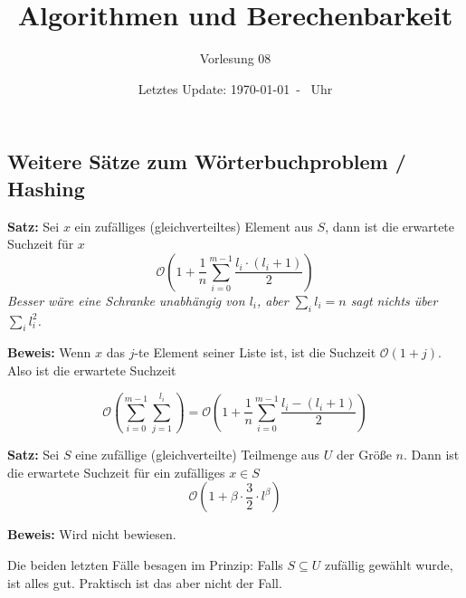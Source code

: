 \documentclass{scrartcl}%
\begin{document}
    \subject{Vorlesungsmitschrift}
    \title{Algorithmen und Berechenbarkeit}
    \subtitle{Vorlesung 08}
    \date{Letztes Update: \today \ - \currenttime \ Uhr}
    \maketitle


    \subsection*{Weitere Sätze zum Wörterbuchproblem / Hashing}\label{subsec:erwarteteSuchzeit}
    \textbf{\textsf{Satz:}} Sei $x$ ein zufälliges (gleichverteiltes) Element aus $S$, dann ist die erwartete Suchzeit für $x$
    \begin{equation*}
        \mathcal{O}\left(1+\dfrac{1}{n} \sum_{i=0}^{m-1}\dfrac{l_i \cdot (l_i + 1)}{2}\right)
    \end{equation*}
    \textit{Besser wäre eine Schranke unabhängig von $l_i$, aber $\sum_{i}l_i = n$ sagt nichts über $\sum_{i}l_{i}^2$.}

    \vspace*{0.3cm}
    \textbf{\textsf{Beweis:}} Wenn $x$ das $j$-te Element seiner Liste ist, ist die Suchzeit $\mathcal{O}(1+j)$.
    Also ist die erwartete Suchzeit

    \begin{equation*}
        \mathcal{O} \left( \sum_{i=0}^{m-1}\sum_{j=1}^{l_i} \right) = \mathcal{O}\left( 1+ \frac{1}{n} \sum_{i=0}^{m-1} \frac{l_i - (l_i+1)}{2} \right)
    \end{equation*}
    \proofend

    \vspace*{0.6cm}
    \textbf{\textsf{Satz:}} Sei $S$ eine zufällige (gleichverteilte) Teilmenge aus $U$ der Größe $n$. Dann ist die erwartete Suchzeit für ein zufälliges $x \in S$
    \begin{equation*}
        \mathcal{O}\left(1+\beta \cdot \frac{3}{2} \cdot l^\beta\right)
    \end{equation*}

    \vspace*{0.3cm}
    \textbf{\textsf{Beweis:}} Wird nicht bewiesen.
    \vspace*{0.3cm}

    Die beiden letzten Fälle besagen im Prinzip: Falls $S \subseteq U$ zufällig gewählt wurde, ist alles gut.
    Praktisch ist das aber nicht der Fall.
\end{document}
